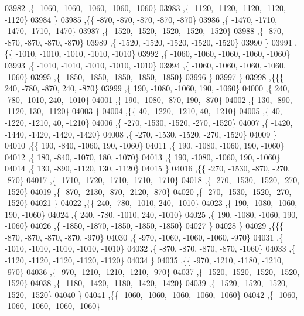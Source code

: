 \begin{DoxyCode}
03982     ,\{ -1060, -1060, -1060, -1060, -1060\}
03983     ,\{ -1120, -1120, -1120, -1120, -1120\}
03984     \}
03985    ,\{\{  -870,  -870,  -870,  -870,  -870\}
03986     ,\{ -1470, -1710, -1470, -1710, -1470\}
03987     ,\{ -1520, -1520, -1520, -1520, -1520\}
03988     ,\{  -870,  -870,  -870,  -870,  -870\}
03989     ,\{ -1520, -1520, -1520, -1520, -1520\}
03990     \}
03991    ,\{\{ -1010, -1010, -1010, -1010, -1010\}
03992     ,\{ -1060, -1060, -1060, -1060, -1060\}
03993     ,\{ -1010, -1010, -1010, -1010, -1010\}
03994     ,\{ -1060, -1060, -1060, -1060, -1060\}
03995     ,\{ -1850, -1850, -1850, -1850, -1850\}
03996     \}
03997    \}
03998   ,\{\{\{   240,  -780,  -870,   240,  -870\}
03999     ,\{   190, -1080, -1060,   190, -1060\}
04000     ,\{   240,  -780, -1010,   240, -1010\}
04001     ,\{   190, -1080,  -870,   190,  -870\}
04002     ,\{   130,  -890, -1120,   130, -1120\}
04003     \}
04004    ,\{\{    40, -1220, -1210,    40, -1210\}
04005     ,\{    40, -1220, -1210,    40, -1210\}
04006     ,\{  -270, -1530, -1520,  -270, -1520\}
04007     ,\{ -1420, -1440, -1420, -1420, -1420\}
04008     ,\{  -270, -1530, -1520,  -270, -1520\}
04009     \}
04010    ,\{\{   190,  -840, -1060,   190, -1060\}
04011     ,\{   190, -1080, -1060,   190, -1060\}
04012     ,\{   180,  -840, -1070,   180, -1070\}
04013     ,\{   190, -1080, -1060,   190, -1060\}
04014     ,\{   130,  -890, -1120,   130, -1120\}
04015     \}
04016    ,\{\{  -270, -1530,  -870,  -270,  -870\}
04017     ,\{ -1710, -1720, -1710, -1710, -1710\}
04018     ,\{  -270, -1530, -1520,  -270, -1520\}
04019     ,\{  -870, -2130,  -870, -2120,  -870\}
04020     ,\{  -270, -1530, -1520,  -270, -1520\}
04021     \}
04022    ,\{\{   240,  -780, -1010,   240, -1010\}
04023     ,\{   190, -1080, -1060,   190, -1060\}
04024     ,\{   240,  -780, -1010,   240, -1010\}
04025     ,\{   190, -1080, -1060,   190, -1060\}
04026     ,\{ -1850, -1870, -1850, -1850, -1850\}
04027     \}
04028    \}
04029   ,\{\{\{  -870,  -870,  -870,  -870,  -970\}
04030     ,\{  -970, -1060, -1060, -1060,  -970\}
04031     ,\{ -1010, -1010, -1010, -1010, -1010\}
04032     ,\{  -870,  -870,  -870,  -870, -1060\}
04033     ,\{ -1120, -1120, -1120, -1120, -1120\}
04034     \}
04035    ,\{\{  -970, -1210, -1180, -1210,  -970\}
04036     ,\{  -970, -1210, -1210, -1210,  -970\}
04037     ,\{ -1520, -1520, -1520, -1520, -1520\}
04038     ,\{ -1180, -1420, -1180, -1420, -1420\}
04039     ,\{ -1520, -1520, -1520, -1520, -1520\}
04040     \}
04041    ,\{\{ -1060, -1060, -1060, -1060, -1060\}
04042     ,\{ -1060, -1060, -1060, -1060, -1060\}

\end{DoxyCode}
